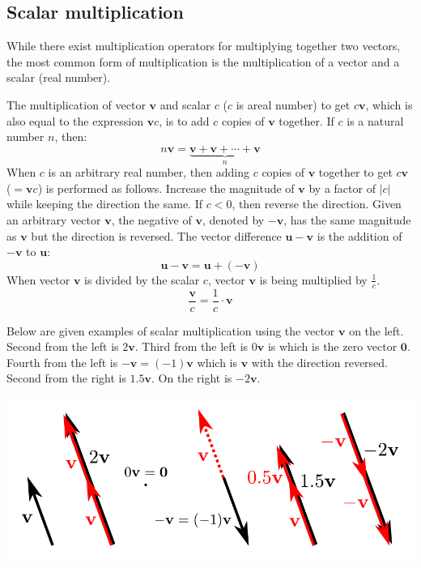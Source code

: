 \documentclass{article}
\begin{document}
\subsection*{Scalar multiplication}

While there exist multiplication operators for multiplying together two vectors, the most common form of multiplication is the multiplication of a vector and a scalar (real number).

The multiplication of vector \(\mathbf{v}\) and scalar \(c\) (\(c\) is areal number) to get \(c\mathbf{v}\), which is also equal to the expression \(\mathbf{v}c\), is to add \(c\) copies of \(\mathbf{v}\) together. If \(c\) is a natural number \(n\), then:
\[n\mathbf{v} = \underbrace{\mathbf{v} + \mathbf{v} + \cdots + \mathbf{v}}_n\]
When \(c\) is an arbitrary real number, then adding \(c\) copies of \(\mathbf{v}\) together to get \(c\mathbf{v}\) (\(= \mathbf{v}c\)) is performed as follows. Increase the magnitude of \(\mathbf{v}\) by a factor of \(|c|\) while keeping the direction the same. If \(c < 0\), then reverse the direction. Given an arbitrary vector \(\mathbf{v}\), the negative of \(\mathbf{v}\), denoted by \(-\mathbf{v}\), has the same magnitude as \(\mathbf{v}\) but the direction is reversed. The vector difference \(\mathbf{u} - \mathbf{v}\) is the addition of \(-\mathbf{v}\) to \(\mathbf{u}\): 
\[\mathbf{u} - \mathbf{v} = \mathbf{u} + (-\mathbf{v})\]
When vector \(\mathbf{v}\) is divided by the scalar \(c\), vector \(\mathbf{v}\) is being multiplied by \(\frac{1}{c}\).
\[\frac{\mathbf{v}}{c} = \frac{1}{c} \cdot \mathbf{v}\]

Below are given examples of scalar multiplication using the vector \(\mathbf{v}\) on the left. Second from the left is \(2\mathbf{v}\). Third from the left is \(0\mathbf{v}\) is which is the zero vector \(\mathbf{0}\). Fourth from the left is \(-\mathbf{v} = (-1)\mathbf{v}\) which is \(\mathbf{v}\) with the direction reversed. Second from the right is \(1.5\mathbf{v}\). On the right is \(-2\mathbf{v}\).

\includegraphics[width = \textwidth]{scalar_multiplication}
\end{document}
